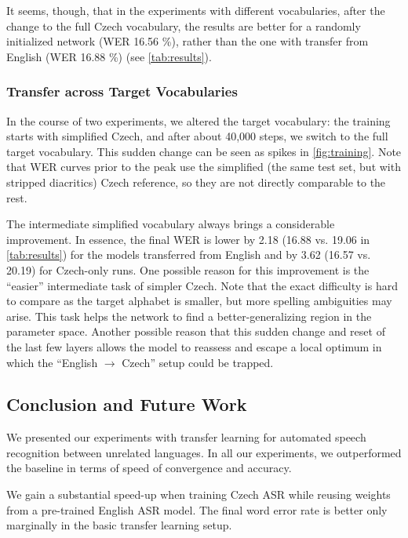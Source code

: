 It seems, though, that in the experiments with different vocabularies, after the change to the full Czech vocabulary, the results are better for a randomly initialized network (WER 16.56 \%), rather than the one with transfer from English (WER 16.88 \%) (see \cref{tab:results}).

\subsubsection{Transfer across Target Vocabularies}

In the course of two experiments, we altered the target vocabulary: the training starts with simplified Czech, and after about 40,000 steps, we switch to the full target vocabulary. This sudden change can be seen as spikes in \cref{fig:training}. Note that WER curves prior to the peak use the simplified (the same test set, but with stripped diacritics) Czech reference, so they are not directly comparable to the rest.

The intermediate simplified vocabulary always brings a considerable improvement. In essence, the final WER is lower by 2.18 (16.88 vs. 19.06 in \cref{tab:results}) for the models transferred from English and by 3.62 (16.57 vs. 20.19) for Czech-only runs.
One possible reason for this improvement is the ``easier'' intermediate task of simpler Czech. Note that the exact difficulty is hard to compare as the target alphabet is smaller, but more spelling ambiguities may arise. This task helps the network to find a better-generalizing region in the parameter space. Another possible reason that this sudden change and reset of the last few layers allows the model to reassess and escape a local optimum in which the ``English $\rightarrow$ Czech'' setup could be trapped.


\subsection{Conclusion and Future Work}
\label{sec:conclusion}

We presented our experiments with transfer learning for automated speech recognition between unrelated languages.
In all our experiments, we outperformed the baseline in terms of speed of convergence and accuracy.

We gain a substantial speed-up when training Czech ASR while reusing weights from a pre-trained English ASR model. The final word error rate is better only marginally in the basic transfer learning setup.

